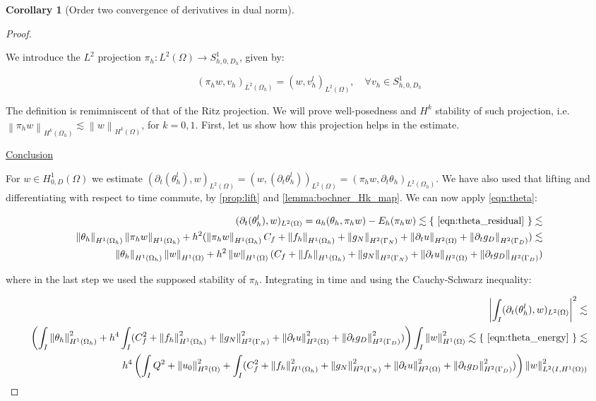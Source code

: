\documentclass[english,a4paper,9pt,oneside]{scrbook}	%
\theoremstyle{break}
\newtheorem{cor}[equation]{Corollary}
\newenvironment{mproof}[1][\proofname]{%
  \begin{proof}[#1]$ $\par\nobreak\ignorespaces
}{%
  \end{proof}
}
\renewcommand*{\proofname}{Proof}
\theoremstyle{remark}
\newcommand{\norm}[1]{\left\lVert#1\right\rVert}
\newcommand{\ind}[1]{\{\text{ #1 }\}}
\begin{document}
\begin{appendices}
\begin{cor}[Order two convergence of derivatives in dual norm]
\end{cor}

\begin{mproof}

We introduce the $L^2$ projection $\pi_h: L^2(\Omega) \rightarrow S^1_{h,0,D_h}$, given by:

$$(\pi_h w, v_h)_{L^2(\Omega_h)}=(w, v_h^l)_{L^2(\Omega)},\quad \forall  v_h \in S^1_{h,0,D_h}$$

The definition is remimniscent of that of the Ritz projection. We will prove well-posedness and $H^k$ stability of such projection, i.e. $\norm{\pi_h w}_{H^k(\Omega_h)}\lesssim\norm{w}_{H^k(\Omega)}$, for $k=0,1$.
First, let us show how this projection helps in the estimate.

\underline{Conclusion}

For $w \in H^1_{0,D}(\Omega)$ we estimate $(\partial_t(\theta_h^l), w)_{L^2(\Omega)} = (w, (\partial_t\theta_h^l))_{L^2(\Omega)} =  (\pi_h w,\partial_t\theta_h)_{L^2(\Omega_h)}$. We have also used that lifting and differentiating with respect to time commute, by \cref{prop:lift} and \cref{lemma:bochner_Hk_map}. We can now apply \cref{eqn:theta}:

\begin{align*}
	(\partial_t(\theta_h^l), w)_{L^2(\Omega)} = a_h(\theta_h, \pi_h w) - E_h(\pi_h w ) \lesssim \ind{\cref{eqn:theta_residual}}\lesssim\\
	\norm{\theta_h}_{H^1(\Omega_h)} \norm{\pi_h w}_{H^1(\Omega_h)} + h^2 (\norm{\pi_h w }_{H^1(\Omega_h)} C_f + \norm{f_h}_{H^1(\Omega_h)} + \norm{g_N}_{H^2(\Gamma_N)} + \norm{\partial_t u}_{H^2(\Omega)} + \norm{\partial_t g_D}_{H^2(\Gamma_D)} ) \lesssim\\
	\norm{\theta_h}_{H^1(\Omega_h)} \norm{ w}_{H^1(\Omega)} + h^2 \norm{w }_{H^1(\Omega)} (C_f + \norm{f_h}_{H^1(\Omega_h)} + \norm{g_N}_{H^2(\Gamma_N)} + \norm{\partial_t u}_{H^2(\Omega)} + \norm{\partial_t g_D}_{H^2(\Gamma_D)} )
\end{align*}

where in the last step we used the supposed stability of $\pi_h$. Integrating in time and using the Cauchy-Schwarz inequality:

\begin{align*}
	\left | \int_I(\partial_t(\theta_h^l), w)_{L^2(\Omega)} \right |^2 \lesssim\\
	\left (\int_I \norm{\theta_h}_{H^1(\Omega_h)}^2+ h^4 \int_I (C_f^2 + \norm{f_h}_{H^1(\Omega_h)}^2 + \norm{g_N}^2_{H^2(\Gamma_N)} + \norm{\partial_t u}^2_{H^2(\Omega)} + \norm{\partial_t g_D}^2_{H^2(\Gamma_D)} )\right) \int_I\norm{ w}_{H^1(\Omega)}^2 \lesssim \ind{\cref{eqn:theta_energy}} \lesssim\\
	h^4 \left (  \int_I Q^2 + \norm{u_0}_{H^2(\Omega)}^2 + \int_I (C_f^2 +\norm{f_h}_{H^1(\Omega_h)}^2 + \norm{g_N}^2_{H^2(\Gamma_N)} + \norm{\partial_t u}^2_{H^2(\Omega)} + \norm{\partial_t g_D}^2_{H^2(\Gamma_D)} )\right) \norm{w}_{L^2(I,H^1(\Omega))}^2
\end{align*}


\end{mproof}
\end{appendices}
\end{document}
